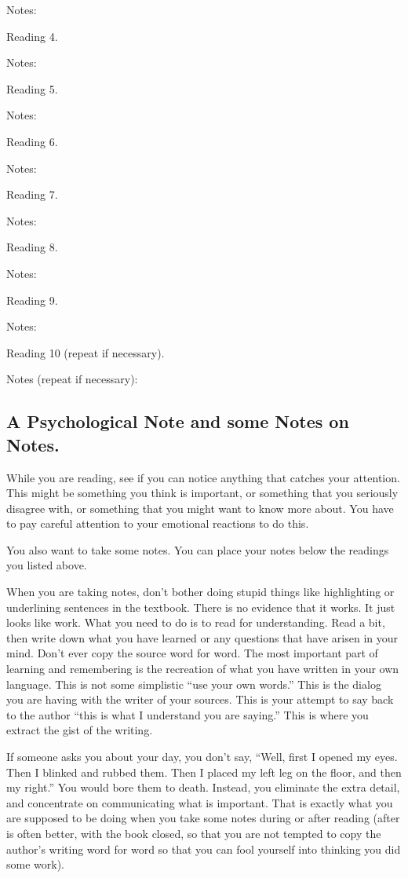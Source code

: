 \documentclass{article}
\begin{document}
Notes:

Reading 4.

Notes:

Reading 5.

Notes:

Reading 6.

Notes:

Reading 7.

Notes:

Reading 8.

Notes:

Reading 9.

Notes:

Reading 10 (repeat if necessary).

Notes (repeat if necessary):

\subsection{A Psychological Note and some Notes on Notes.}

While you are reading, see if you can notice anything that catches your
attention. This might be something you think is important, or something
that you seriously disagree with, or something that you might want to
know more about. You have to pay careful attention to your emotional
reactions to do this.

You also want to take some notes. You can place your notes below the
readings you listed above.

When you are taking notes, don't bother doing stupid things like
highlighting or underlining sentences in the textbook. There is no
evidence that it works. It just looks like work. What you need to do is
to read for understanding. Read a bit, then write down what you have
learned or any questions that have arisen in your mind. Don't ever copy
the source word for word. The most important part of learning and
remembering is the recreation of what you have written in your own
language. This is not some simplistic ``use your own words.'' This is
the dialog you are having with the writer of your sources. This is your
attempt to say back to the author ``this is what I understand you are
saying.'' This is where you extract the gist of the writing.

If someone asks you about your day, you don't say, ``Well, first I
opened my eyes. Then I blinked and rubbed them. Then I placed my left
leg on the floor, and then my right.'' You would bore them to death.
Instead, you eliminate the extra detail, and concentrate on
communicating what is important. That is exactly what you are supposed
to be doing when you take some notes during or after reading (after is
often better, with the book closed, so that you are not tempted to copy
the author's writing word for word so that you can fool yourself into
thinking you did some work).
\end{document}
